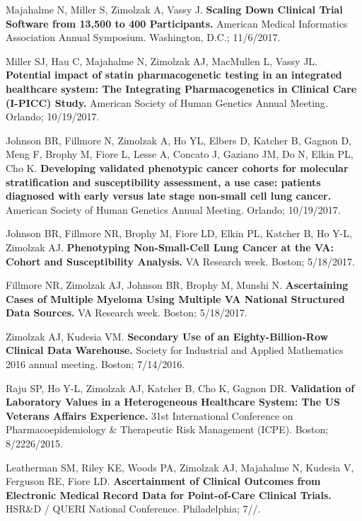 \documentclass[10pt]{article}
\begin{document}
Majahalme N, Miller S, Zimolzak A, Vassy J. \textbf{Scaling Down
  Clinical Trial Software from 13,500 to 400 Participants.} American
Medical Informatics Association Annual Symposium. Washington, D.C.;
11/6/2017.

Miller SJ, Hau C, Majahalme N, Zimolzak AJ, MacMullen L, Vassy JL.
\textbf{Potential impact of statin pharmacogenetic testing in an
  integrated healthcare system: The Integrating Pharmacogenetics in
  Clinical Care (I-PICC) Study.} American Society of Human Genetics
Annual Meeting. Orlando; 10/19/2017.

Johnson BR, Fillmore N, Zimolzak A, Ho YL, Elbers D, Katcher B, Gagnon
D, Meng F, Brophy M, Fiore L, Lesse A, Concato J, Gaziano JM, Do N,
Elkin PL, Cho K. \textbf{Developing validated phenotypic cancer
  cohorts for molecular stratification and susceptibility assessment,
  a use case: patients diagnosed with early versus late stage
  non-small cell lung cancer.} American Society of Human Genetics
Annual Meeting. Orlando; 10/19/2017.

Johnson BR, Fillmore NR, Brophy M, Fiore LD, Elkin PL, Katcher B, Ho
Y-L, Zimolzak AJ. \textbf{Phenotyping Non-Small-Cell Lung Cancer at
  the VA: Cohort and Susceptibility Analysis.} VA Research week.
Boston; 5/18/2017.

Fillmore NR, Zimolzak AJ, Johnson BR, Brophy M, Munshi N.
\textbf{Ascertaining Cases of Multiple Myeloma Using Multiple VA
  National Structured Data Sources.} VA Research week. Boston;
5/18/2017.

Zimolzak AJ, Kudesia VM. \textbf{Secondary Use of an
  Eighty-Billion-Row Clinical Data Warehouse.} Society for Industrial
and Applied Mathematics 2016 annual meeting. Boston; 7/14/2016.

Raju SP, Ho Y-L, Zimolzak AJ, Katcher B, Cho K, Gagnon DR.
\textbf{Validation of Laboratory Values in a Heterogeneous Healthcare
  System: The US Veterans Affairs Experience.} 31st International
Conference on Pharmacoepidemiology \& Therapeutic Risk Management
(ICPE). Boston; 8/22\ndash{}26/2015.

Leatherman SM, Riley KE, Woods PA, Zimolzak AJ, Majahalme N, Kudesia
V, Ferguson RE, Fiore LD. \textbf{Ascertainment of Clinical Outcomes
  from Electronic Medical Record Data for Point-of-Care Clinical
  Trials.} HSR\&D / QUERI National Conference. Philadelphia;
7/\ndash{}/.
\end{document}
